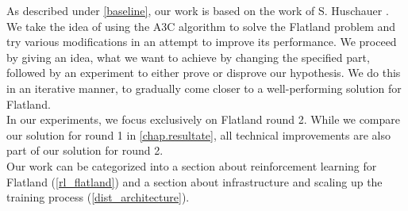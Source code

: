 As described under \autoref{baseline}, our work is based on the work of S. Huschauer \cite{flatlandstephan}. We take the idea of using the A3C algorithm to solve the Flatland problem and try various modifications in an attempt to improve its performance. We proceed by giving an idea, what we want to achieve by changing the specified part, followed by an experiment to either prove or disprove our hypothesis. We do this in an iterative manner, to gradually come closer to a well-performing solution for Flatland.\\
In our experiments, we focus exclusively on Flatland round 2. While we compare our solution for round 1 in \autoref{chap.resultate}, all technical improvements are also part of our solution for round 2.\\
Our work can be categorized into a section about reinforcement learning for Flatland (\autoref{rl_flatland}) and a section about infrastructure and scaling up the training process (\autoref{dist_architecture}).\\
